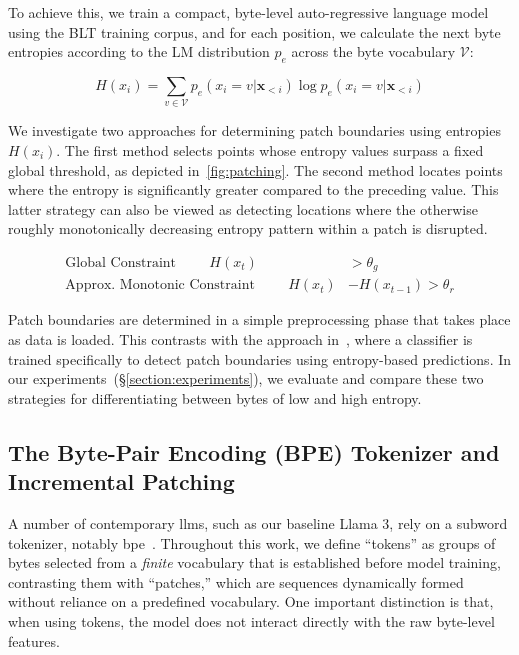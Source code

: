 To achieve this, we train a compact, byte-level auto-regressive language model using the {\textsc BLT} training corpus, and for each position, we calculate the next byte entropies according to the LM distribution $p_{e}$ across the byte vocabulary $\mathcal{V}$:

\begin{equation}
H(x_i) = \sum_{v \in \mathcal{V}} p_{e}(x_i=v|\pmb{x}_{<i}) \log p_{e}(x_i=v|\pmb{x}_{<i})
\end{equation}

We investigate two approaches for determining patch boundaries using entropies $H(x_i)$. The first method selects points whose entropy values surpass a fixed global threshold, as depicted in~\autoref{fig:patching}. The second method locates points where the entropy is significantly greater compared to the preceding value. This latter strategy can also be viewed as detecting locations where the otherwise roughly monotonically decreasing entropy pattern within a patch is disrupted.

\begin{align*}
    \text{Global Constraint}\hspace{1cm}H(x_t)& > \theta_g\\
    \text{Approx. Monotonic Constraint}\hspace{1cm}H(x_t)& - H(x_{t-1}) > \theta_r
\end{align*}

Patch boundaries are determined in a simple preprocessing phase that takes place as data is loaded. This contrasts with the approach in~\citet{nawrot-etal-2023-efficient}, where a classifier is trained specifically to detect patch boundaries using entropy-based predictions. In our experiments~(\S\ref{section:experiments}), we evaluate and compare these two strategies for differentiating between bytes of low and high entropy.

\subsection{The Byte-Pair Encoding (BPE) Tokenizer and Incremental Patching}
\label{section:incremental-patching}
\label{section:bpe-patch}

A number of contemporary llms, such as our baseline Llama 3, rely on a subword tokenizer, notably bpe~\citep{gage1994new, sennrich-etal-2016-neural}. Throughout this work, we define ``tokens'' as groups of bytes selected from a \textit{finite} vocabulary that is established before model training, contrasting them with ``patches,'' which are sequences dynamically formed without reliance on a predefined vocabulary. One important distinction is that, when using tokens, the model does not interact directly with the raw byte-level features.

